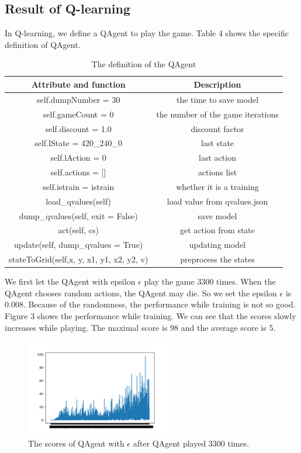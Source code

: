 \documentclass[conference,compsoc]{IEEEtran}
\begin{document}
\subsection{Result of Q-learning}
\indent In Q-learning, we define a QAgent to play the game. Table 4 shows the specific definition of QAgent.

\begin{table}[!t]
\renewcommand{\arraystretch}{1.3}
\caption{The definition of the QAgent}
\label{table_4}
\centering
\begin{tabular}{|c|c|}
\hline
Attribute and function & Description\\
\hline
self.dumpNumber = 30& the time to save model\\
\hline
self.gameCount = 0 & the number of the game iterations\\
\hline
self.discount = 1.0 & discount factor\\
\hline
self.lState = 420\_240\_0 & last state\\
\hline
self.lAction = 0 & last action\\
\hline
self.actions = [] & actions list\\
\hline
self.istrain = istrain & whether it is a training\\
\hline
load\_qvalues(self) & load value from qvalues.json\\
\hline
dump\_qvalues(self, exit = False) & save model\\
\hline
act(self, cs) & get action from state\\
\hline
update(self, dump\_qvalues = True) & updating model\\
\hline
stateToGrid(self,x, y, x1, y1, x2, y2, v) &preprocess the states\\
\hline
\end{tabular}
\end{table}

\indent We first let the QAgent with epsilon ${\epsilon}$  play the game 3300 times. When the QAgent chooses random actions, the QAgent may die. So we set the epsilon ${\epsilon}$  is 0.008. Because of the randomness, the performance while training is not so good. Figure 3 shows the performance while training. We can see that the scores slowly increases while playing. The maximal score is 98 and the average score is 5.

\begin{figure}[!t]
\centering
\includegraphics[width=2.5in]{Qlearn_Ep_result.png}
\caption{The scores of QAgent with ${\epsilon}$ after QAgent played 3300 times.}
\label{fig3}
\end{figure}
\end{document}
